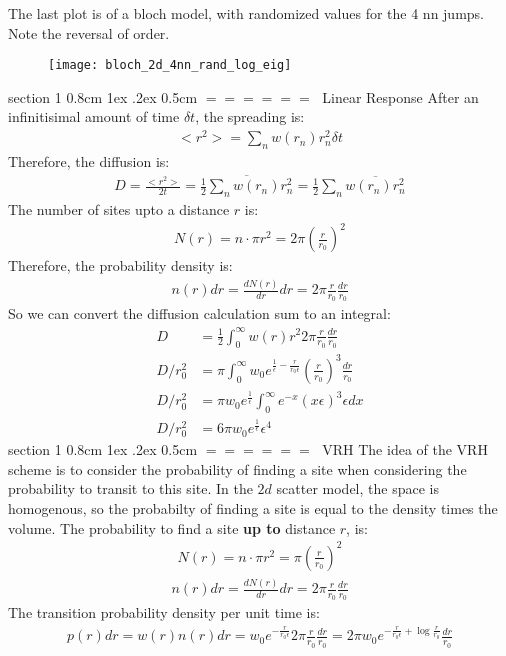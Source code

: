\documentclass[onecolumn,fleqn,notitlepage,secnumarabic]{revtex4}
\makeatletter
\def\section{%
  \@startsection
    {section}%
    {1}%
    {\z@}%
    {0.8cm \@plus1ex \@minus .2ex}%
    {0.5cm}%
    {\Large\bf $=\!=\!=\!=\!=\!=\;$}%
}%
\renewcommand{\includegraphics}[2][]{\ \\ \ FIGURE: \ \\ \ }
\makeatother
\begin{document}

The last plot is of a bloch model, with randomized values for the 4 nn jumps. Note the reversal of order.
\begin{figure}[H]
\texttt{[image: bloch\_2d\_4nn\_rand\_log\_eig]}
\end{figure}

\section{Linear Response}
After an infinitisimal amount of time $\delta t$, the spreading is:
\begin{align}   <r^2> = \sum_n w(r_n) r_n^2 \delta t \end{align}  
Therefore, the diffusion is:
\begin{align}   D = \frac{<r^2>}{2t} =  \overline{\frac{1}{2} \sum_n w(r_n) r_n^2} = \frac{1}{2}\sum_n \overline{w(r_n)r_n^2}\end{align}  
The number of sites upto a distance $r$ is:
\begin{align}   N(r) = n\cdot \pi r^2 = 2\pi\left(\frac{r}{r_0}\right)^2\end{align}  
Therefore, the probability density is:
\begin{align}   n(r)dr = \frac{dN(r)}{dr}dr = 2\pi \frac{r}{r_0}\frac{dr}{r_0}\end{align}  
So we can convert the diffusion calculation sum to an integral:
\begin{align} 
  D &= \frac{1}{2}\int_0^\infty w(r) r^2 2\pi \frac{r}{r_0} \frac{dr}{r_0} \\
  D/r_0^2 &= \pi \int_0^\infty w_0 e^{\frac{1}{\epsilon}-\frac{r}{r_0\epsilon}} \left(\frac{r}{r_0}\right)^3 \frac{dr}{r_0} \\
  D/r_0^2 &= \pi w_0 e^{\frac{1}{\epsilon}}\int_0^\infty  e^{-x} (x\epsilon)^3 \epsilon dx\\
  D/r_0^2 &= 6\pi w_0 e^{\frac{1}{\epsilon}}\epsilon^4 
\end{align}
\section{VRH}
The idea of the VRH scheme is to consider the probability of finding a site when considering the probability to transit to this site. In the $2d$ scatter model, the space is homogenous, so the probabilty of finding a site is equal to the density times the volume. The probability to find a site {\bf up to} distance $r$, is:
\begin{align}   N(r) = n\cdot \pi r^2 = \pi \left(\frac{r}{r_0}\right)^2\end{align}  
\begin{align}   n(r)dr = \frac{dN(r)}{dr}dr = 2\pi \frac{r}{r_0}\frac{dr}{r_0}\end{align}  
The transition probability density per unit time is:
\begin{align}  p(r)dr = w(r)n(r)dr = w_0 e^{-\frac{r}{r_0\epsilon}}2\pi \frac{r}{r_0}\frac{dr}{r_0}=2\pi w_0 e^{-\frac{r}{r_0\epsilon} + \log\frac{r}{r_0}}\frac{dr}{r_0}
\end{align}  
\end{document}

